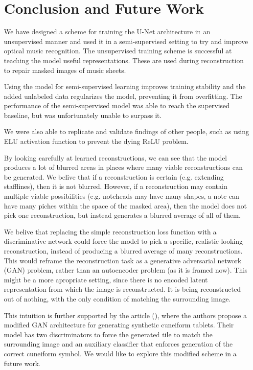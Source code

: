 \chapter{Conclusion and Future Work}
\label{chap:ConclusionAndFutureWork}

We have designed a scheme for training the U-Net architecture in an unsupervised manner and used it in a semi-supervised setting to try and improve optical music recognition. The unsupervised training scheme is successful at teaching the model useful representations. These are used during reconstruction to repair masked images of music sheets.

Using the model for semi-supervised learning improves training stability and the added unlabeled data regularizes the model, preventing it from overfitting. The performance of the semi-supervised model was able to reach the supervised baseline, but was unfortunately unable to surpass it.

We were also able to replicate and validate findings of other people, such as using ELU activation function to prevent the dying ReLU problem.

By looking carefully at learned reconstructions, we can see that the model produces a lot of blurred areas in places where many viable reconstructions can be generated. We belive that if a reconstruction is certain (e.g. extending stafflines), then it is not blurred. However, if a reconstruction may contain multiple viable possibilities (e.g. noteheads may have many shapes, a note can have many piches within the space of the masked area), then the model does not pick one reconstruction, but instead generates a blurred average of all of them.

We belive that replacing the simple reconstruction loss function with a discriminative network could force the model to pick a specific, realistic-looking reconstruction, instead of producing a blurred average of many reconstructions. This would reframe the reconstruction task as a generative adversarial network (GAN) problem, rather than an autoencoder problem (as it is framed now). This might be a more apropriate setting, since there is no encoded latent representation from which the image is reconstructed. It is being reconstructed out of nothing, with the only condition of matching the surrounding image.

This intuition is further supported by the article (\cite{Cuneiforms}), where the authors propose a modified GAN architecture for generating synthetic cuneiform tablets. Their model has two discriminators to force the generated tile to match the surrounding image and an auxiliary classifier that enforces generation of the correct cuneiform symbol. We would like to explore this modified scheme in a future work.

